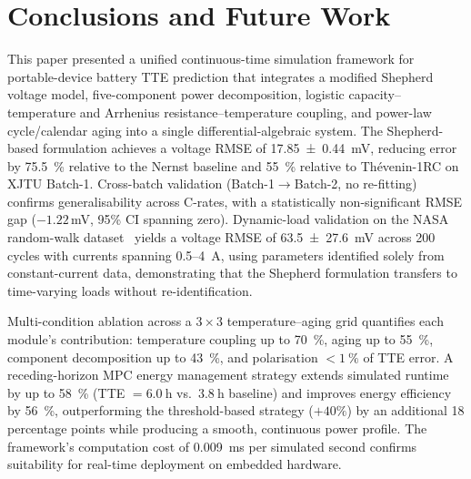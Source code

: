 \documentclass[5p,times,number]{elsarticle}
\begin{document}
\section{Conclusions and Future Work}\label{sec:conclusion}
This paper presented a unified continuous-time simulation framework for portable-device battery TTE prediction that integrates a modified Shepherd voltage model, five-component power decomposition, logistic capacity--temperature and Arrhenius resistance--temperature coupling, and power-law cycle/calendar aging into a single differential-algebraic system.
The Shepherd-based formulation achieves a voltage RMSE of \SI{17.85 \pm 0.44}{\milli\volt}, reducing error by \SI{75.5}{\percent} relative to the Nernst baseline and \SI{55}{\percent} relative to Th\'{e}venin-1RC on XJTU Batch-1.
Cross-batch validation (Batch-1$\to$Batch-2, no re-fitting) confirms generalisability across C-rates, with a statistically non-significant RMSE gap ($-1.22$\,mV, 95\% CI spanning zero).
Dynamic-load validation on the NASA random-walk dataset~\cite{Bole2014} yields a voltage RMSE of \SI{63.5 \pm 27.6}{\milli\volt} across 200 cycles with currents spanning 0.5--\SI{4}{\ampere}, using parameters identified solely from constant-current data, demonstrating that the Shepherd formulation transfers to time-varying loads without re-identification.

Multi-condition ablation across a $3 \times 3$ temperature--aging grid quantifies each module's contribution: temperature coupling up to \SI{70}{\percent}, aging up to \SI{55}{\percent}, component decomposition up to \SI{43}{\percent}, and polarisation $<\SI{1}{\percent}$ of TTE error.
A receding-horizon MPC energy management strategy extends simulated runtime by up to \SI{58}{\percent} (TTE $= \SI{6.0}{\hour}$ vs.\ $\SI{3.8}{\hour}$ baseline) and improves energy efficiency by \SI{56}{\percent}, outperforming the threshold-based strategy ($+40\%$) by an additional 18 percentage points while producing a smooth, continuous power profile.
The framework's computation cost of \SI{0.009}{\milli\second} per simulated second confirms suitability for real-time deployment on embedded hardware.
\end{document}
